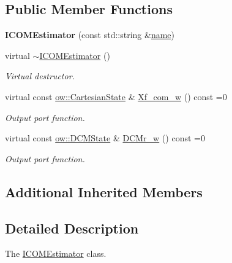 \subsection*{Public Member Functions}
\begin{DoxyCompactItemize}
\item 
{\bfseries I\+C\+O\+M\+Estimator} (const std\+::string \&\hyperlink{classow_1_1GenericModuleBase_a4b712883728cdbab7779e27f9a23689c}{name})\hypertarget{classow_1_1ICOMEstimator_a602fce5de417ba1f245c7a6ee47b93d2}{}\label{classow_1_1ICOMEstimator_a602fce5de417ba1f245c7a6ee47b93d2}

\item 
virtual \hyperlink{classow_1_1ICOMEstimator_a9c1d13779ec3a3248cce49743f939302}{$\sim$\+I\+C\+O\+M\+Estimator} ()\hypertarget{classow_1_1ICOMEstimator_a9c1d13779ec3a3248cce49743f939302}{}\label{classow_1_1ICOMEstimator_a9c1d13779ec3a3248cce49743f939302}

\begin{DoxyCompactList}\small\item\em Virtual destructor. \end{DoxyCompactList}\item 
virtual const \hyperlink{classow__core_1_1CartesianState}{ow\+::\+Cartesian\+State} \& \hyperlink{classow_1_1ICOMEstimator_a96fc5dc80ed0f61b0a7a300d8519a9af}{Xf\+\_\+com\+\_\+w} () const =0
\begin{DoxyCompactList}\small\item\em Output port function. \end{DoxyCompactList}\item 
virtual const \hyperlink{classow__core_1_1DivergentComponentOfMotionState}{ow\+::\+D\+C\+M\+State} \& \hyperlink{classow_1_1ICOMEstimator_a39feef3509fbe0f8dbf358c28b067e43}{D\+C\+Mr\+\_\+w} () const =0
\begin{DoxyCompactList}\small\item\em Output port function. \end{DoxyCompactList}\end{DoxyCompactItemize}
\subsection*{Additional Inherited Members}


\subsection{Detailed Description}
The \hyperlink{classow_1_1ICOMEstimator}{I\+C\+O\+M\+Estimator} class. 

